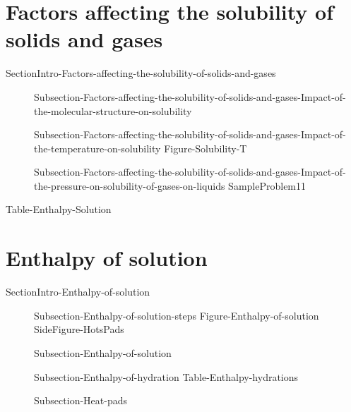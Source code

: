 \documentclass[main.tex]{subfiles}
\newcommand\chapterlabel{Ch-solutions}\setcounter{figurenewcounter}{0}\setcounter{tablenewcounter}{0}\setcounter{formulanewcounter}{0}\chapterpicture{../{\chapterlabel}/figure1}\chapterpicturelabel{PxFuel}
\begin{document}
\section{Factors affecting the solubility of solids and gases}{SectionIntro-Factors-affecting-the-solubility-of-solids-and-gases}
\sloppy \begin{description}
\item[] {Subsection-Factors-affecting-the-solubility-of-solids-and-gases-Impact-of-the-molecular-structure-on-solubility}
\item[] {Subsection-Factors-affecting-the-solubility-of-solids-and-gases-Impact-of-the-temperature-on-solubility}
{Figure-Solubility-T}
\item[] {Subsection-Factors-affecting-the-solubility-of-solids-and-gases-Impact-of-the-pressure-on-solubility-of-gases-on-liquids}
{SampleProblem11}
\end{description}




{Table-Enthalpy-Solution}
\hspace{-5cm}{Figure-Enthalpy-of-mixing-diagram }
\section{Enthalpy of solution}{SectionIntro-Enthalpy-of-solution}
\sloppy \begin{description}
\item[] {Subsection-Enthalpy-of-solution-steps}
{Figure-Enthalpy-of-solution}
{SideFigure-HotsPads}

\item[] {Subsection-Enthalpy-of-solution}
\item[] {Subsection-Enthalpy-of-hydration}
{Table-Enthalpy-hydrations}
\item[] {Subsection-Heat-pads}
\end{description}


\checkoddpage\ifoddpage \clearpage\thispagestyle{empty}\mbox{}\clearpage \else  \fi 
\end{document}
